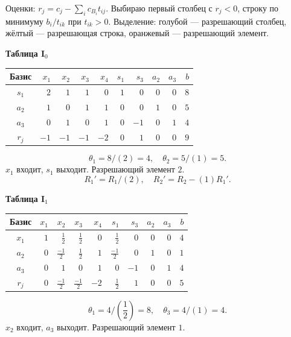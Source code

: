 \documentclass[12pt,a4paper]{article}
\begin{document}
Оценки: $r_j=c_j-\sum_i c_{B_i}t_{ij}$.
Выбираю первый столбец с $r_j<0$, строку по минимуму $b_i/t_{ik}$ при $t_{ik}>0$.
Выделение: голубой — разрешающий столбец, жёлтый — разрешающая строка, оранжевый — разрешающий элемент.
\par\textbf{Таблица I$_{0}$}\begin{center}\small\setlength{\tabcolsep}{4pt}\begin{tabular}{c|rrrrrrrr|r}\hline
Базис & \cellcolor{cyan!18}$x_{1}$ & $x_{2}$ & $x_{3}$ & $x_{4}$ & $s_{1}$ & $s_{3}$ & $a_{2}$ & $a_{3}$ & $b$\\\hline
\rowcolor{yellow!25}$s_{1}$ & \cellcolor{orange!45}$2$ & $1$ & $1$ & $0$ & $1$ & $0$ & $0$ & $0$ & $8$\\
$a_{2}$ & \cellcolor{cyan!18}$1$ & $0$ & $1$ & $1$ & $0$ & $0$ & $1$ & $0$ & $5$\\
$a_{3}$ & \cellcolor{cyan!18}$0$ & $1$ & $0$ & $1$ & $0$ & $-1$ & $0$ & $1$ & $4$\\
\hline $r_j$ & \cellcolor{cyan!18}$-1$ & $-1$ & $-1$ & $-2$ & $0$ & $1$ & $0$ & $0$ & $9$\\\hline\end{tabular}\end{center}
\[\theta_{1}=8/(2)=4,\quad \theta_{2}=5/(1)=5.\]
$x_{1}$ входит, $s_{1}$ выходит. Разрешающий элемент $2$.
\[R_{1}'=R_{1}/(2),\quad R_{2}'=R_{2}-(1)R_{1}'.\]
\newpage
\par\textbf{Таблица I$_{1}$}\begin{center}\small\setlength{\tabcolsep}{4pt}\begin{tabular}{c|rrrrrrrr|r}\hline
Базис & $x_{1}$ & \cellcolor{cyan!18}$x_{2}$ & $x_{3}$ & $x_{4}$ & $s_{1}$ & $s_{3}$ & $a_{2}$ & $a_{3}$ & $b$\\\hline
$x_{1}$ & $1$ & \cellcolor{cyan!18}$\frac{1}{2}$ & $\frac{1}{2}$ & $0$ & $\frac{1}{2}$ & $0$ & $0$ & $0$ & $4$\\
$a_{2}$ & $0$ & \cellcolor{cyan!18}$\frac{-1}{2}$ & $\frac{1}{2}$ & $1$ & $\frac{-1}{2}$ & $0$ & $1$ & $0$ & $1$\\
\rowcolor{yellow!25}$a_{3}$ & $0$ & \cellcolor{orange!45}$1$ & $0$ & $1$ & $0$ & $-1$ & $0$ & $1$ & $4$\\
\hline $r_j$ & $0$ & \cellcolor{cyan!18}$\frac{-1}{2}$ & $\frac{-1}{2}$ & $-2$ & $\frac{1}{2}$ & $1$ & $0$ & $0$ & $5$\\\hline\end{tabular}\end{center}
\[\theta_{1}=4/(\frac{1}{2})=8,\quad \theta_{3}=4/(1)=4.\]
$x_{2}$ входит, $a_{3}$ выходит. Разрешающий элемент $1$.
\end{document}
